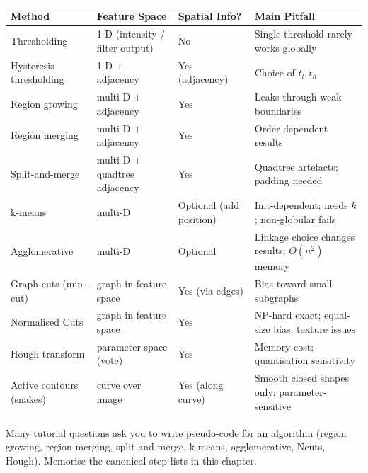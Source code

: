 \begin{center}
\renewcommand{\arraystretch}{1.3}
\begin{tabular}{@{} l p{3.6cm} p{3.6cm} p{3.6cm} @{}}
\toprule
\textbf{Method} & \textbf{Feature Space} & \textbf{Spatial Info?} & \textbf{Main Pitfall} \\
\midrule
Thresholding & 1-D (intensity / filter output) & No & Single threshold rarely works globally \\
Hysteresis thresholding & 1-D + adjacency & Yes (adjacency) & Choice of $t_l, t_h$ \\
Region growing & multi-D + adjacency & Yes & Leaks through weak boundaries \\
Region merging & multi-D + adjacency & Yes & Order-dependent results \\
Split-and-merge & multi-D + quadtree adjacency & Yes & Quadtree artefacts; padding needed \\
k-means & multi-D & Optional (add position) & Init-dependent; needs $k$; non-globular fails \\
Agglomerative & multi-D & Optional & Linkage choice changes results; $O(n^2)$ memory \\
Graph cuts (min-cut) & graph in feature space & Yes (via edges) & Bias toward small subgraphs \\
Normalised Cuts & graph in feature space & Yes & NP-hard exact; equal-size bias; texture issues \\
Hough transform & parameter space (vote) & Yes & Memory cost; quantisation sensitivity \\
Active contours (snakes) & curve over image & Yes (along curve) & Smooth closed shapes only; parameter-sensitive \\
\bottomrule
\end{tabular}
\end{center}

\begin{tipbox}
Many tutorial questions ask you to write pseudo-code for an algorithm (region growing, region merging, split-and-merge, k-means, agglomerative, Ncuts, Hough). Memorise the canonical step lists in this chapter.
\end{tipbox}
